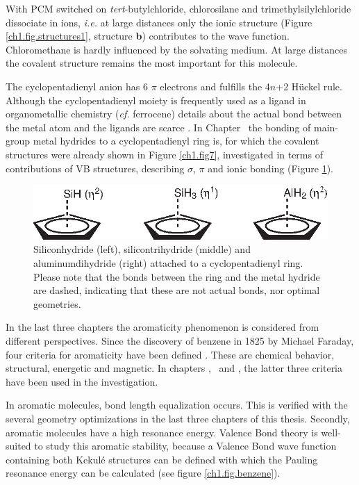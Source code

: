With PCM switched on \textit{tert}-butylchloride, chlorosilane and trimethylsilylchloride dissociate in ions, \textit{i.e.} at large distances only the ionic structure (Figure \ref{ch1.fig.structures1}, structure \textbf{b}) contributes to the wave function.  Chloromethane is hardly influenced by the solvating medium. At large distances the covalent structure remains the most important for this molecule.  

The cyclopentadienyl anion has 6 $\pi$ electrons and fulfills the 4$n$+2 H\"{u}ckel rule. Although the cyclopentadienyl moiety is frequently used as a ligand in organometallic chemistry (\textit{cf.} ferrocene) details about the actual bond between the metal atom and the ligands are scarce \cite{budzelaar}. In Chapter \chcyclopentadienyl\ the bonding of main-group metal hydrides to a cyclopentadienyl ring is, for which the covalent structures were already shown in Figure \ref{ch1.fig7}, investigated in terms of contributions of VB structures, describing $\sigma$, $\pi$ and ionic bonding (Figure \ref{ch1.fig.mhydride}).
\begin{figure}[ht]
\center
\includegraphics{introduction/figures/mhydride.eps}
\caption{Siliconhydride (left), silicontrihydride (middle) and aluminumdihydride (right) attached to a cyclopentadienyl ring. Please note that the bonds between the ring and the metal hydride are dashed, indicating that these are not actual bonds, nor optimal geometries.}
\label{ch1.fig.mhydride}
\end{figure}

In the last three chapters the aromaticity phenomenon is considered from different perspectives. Since the discovery of benzene in 1825 by Michael Faraday, four criteria for aromaticity have been defined \cite{aromaticity}. These are chemical behavior, structural, energetic and magnetic. In chapters \chhuckel, \chinorganic\ and \chindacene, the latter three criteria have been used in the investigation. 

In aromatic molecules, bond length equalization occurs. This is verified with the several geometry optimizations in the last three chapters of this thesis. Secondly, aromatic molecules have a high resonance energy. Valence Bond theory is well-suited to study this aromatic stability, because a Valence Bond wave function containing both Kekul\'{e} structures can be defined with which the Pauling resonance energy can be calculated \cite{pauling5} (see figure \ref{ch1.fig.benzene}).

